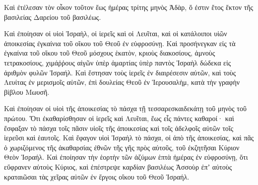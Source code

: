 {\par }{\PP {}Καὶ ἐτέλεσαν τὸν οἶκον τοῦτον ἕως ἡμέρας τρίτης μηνὸς Ἀδὰρ, ὅ ἐστιν ἔτος ἕκτον τῆς βασιλείας Δαρείου τοῦ βασιλέως.
\par }{\PP {}Καὶ ἐποίησαν οἱ υἱοὶ Ἰσραὴλ, οἱ ἱερεῖς καὶ οἱ Λευῖται, καὶ οἱ κατάλοιποι υἱῶν ἀποικεσίας ἐγκαίνια τοῦ οἴκου τοῦ Θεοῦ ἐν εὐφροσύνῃ.
Καὶ προσήνεγκαν εἰς τὰ ἐγκαίνια τοῦ οἴκου τοῦ Θεοῦ μόσχους ἑκατὸν, κριοὺς διακοσίους, ἀμνοὺς τετρακοσίους, χιμάῤῥους αἰγῶν ὑπὲρ ἁμαρτίας ὑπὲρ παντὸς Ἰσραὴλ δώδεκα εἰς ἀριθμὸν φυλῶν Ἰσραήλ.
Καὶ ἔστησαν τοὺς ἱερεῖς ἐν διαιρέσεσιν αὐτῶν, καὶ τοὺς Λευίτας ἐν μερισμοῖς αὐτῶν, ἐπὶ δουλείας Θεοῦ ἐν Ἱερουσαλὴμ, κατὰ τὴν γραφὴν βίβλου Μωυσῆ.
\par }{\PP {}Καὶ ἐποίησαν οἱ υἱοὶ τῆς ἀποικεσίας τὸ πάσχα τῇ τεσσαρεσκαιδεκάτῃ τοῦ μηνὸς τοῦ πρώτου.
Ὅτι ἐκαθαρίσθησαν οἱ ἱερεῖς καὶ Λευῖται, ἕως εἷς πάντες καθαροί· καὶ ἔσφαξαν τὸ πάσχα τοῖς πᾶσιν υἱοῖς τῆς ἀποικεσίας καὶ τοῖς ἀδελφοῖς αὐτῶν τοῖς ἱερεῦσι καὶ ἑαυτοῖς.
Καὶ ἔφαγον υἱοὶ Ἰσραὴλ τὸ πάσχα, οἱ ἀπὸ τῆς ἀποικεσίας, καὶ πᾶς ὁ χωριζόμενος τῆς ἀκαθαρσίας ἐθνῶν τῆς γῆς πρὸς αὐτοῦς, τοῦ ἐκζητῆσαι Κύριον Θεὸν Ἰσραήλ.
Καὶ ἐποίησαν τὴν ἑορτὴν τῶν ἀζύμων ἑπτὰ ἡμέρας ἐν εὐφροσύνῃ, ὅτι εὔφρανεν αὐτοὺς Κύριος, καὶ ἐπέστρεψε καρδίαν βασιλέως Ἀσσοὺρ ἐπʼ αὐτοὺς κραταιῶσαι τὰς χεῖρας αὐτῶν ἐν ἔργοις οἴκου τοῦ Θεοῦ Ἰσραήλ.

}
